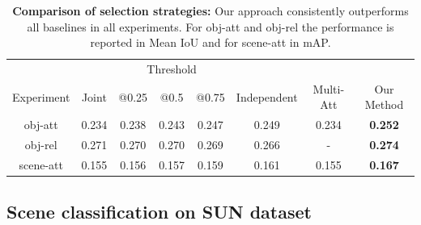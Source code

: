 \documentclass[runningheads]{llncs}
\newcommand{\RevComment} [1]{{\color{Red}{#1}}}
\begin{document}
\begin{table}[t]
\begin{center}
\begin{tabular}{| c || c | c | c | c | c | c | c |}
\hline
& & \multicolumn{3}{c|}{Threshold} & & &\\
Experiment & Joint & @0.25 & @0.5 & @0.75 & Independent & Multi-Att\cite{Rastegari2013} & Our Method \\ \midrule
\hline\hline
obj-att   & 0.234 & 0.238&0.243&0.247 & 0.249 & 0.234 & {\bf 0.252} \\ \midrule
\hline
obj-rel   & 0.271 & 0.270&0.270&0.269 & 0.266 & -     & {\bf 0.274} \\ \midrule
\hline
scene-att & 0.155  & 0.156&0.157&0.159 & 0.161 & 0.155 & {\bf 0.167} \\ \midrule
\hline
\end{tabular}
\end{center}
\caption{{\bf Comparison of selection strategies:} Our approach consistently outperforms all baselines in all experiments. For obj-att and obj-rel the performance is reported in Mean IoU and for scene-att in mAP.}
\label{tab:performance_summary}
\vspace*{-\baselineskip}
\vspace*{-\baselineskip}
\end{table}

\vspace{-0.05in}
\subsection{Scene classification on SUN dataset}

\end{document}

